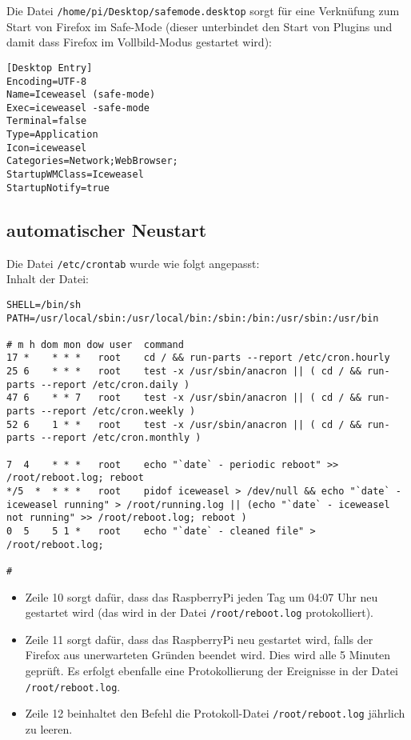 Die Datei \lstinline|/home/pi/Desktop/safemode.desktop| sorgt für eine Verknüfung zum Start von Firefox im Safe-Mode (dieser unterbindet den Start von Plugins und damit dass Firefox im Vollbild-Modus gestartet wird):\\
\begin{lstlisting}
[Desktop Entry]
Encoding=UTF-8
Name=Iceweasel (safe-mode)
Exec=iceweasel -safe-mode
Terminal=false
Type=Application
Icon=iceweasel
Categories=Network;WebBrowser;
StartupWMClass=Iceweasel
StartupNotify=true
\end{lstlisting}

\subsection{automatischer Neustart}
\label{sec:rebootconf}
Die Datei \lstinline|/etc/crontab| wurde wie folgt angepasst:\\
Inhalt der Datei:
\begin{lstlisting}
SHELL=/bin/sh
PATH=/usr/local/sbin:/usr/local/bin:/sbin:/bin:/usr/sbin:/usr/bin

# m h dom mon dow user	command
17 *	* * *	root    cd / && run-parts --report /etc/cron.hourly
25 6	* * *	root	test -x /usr/sbin/anacron || ( cd / && run-parts --report /etc/cron.daily )
47 6	* * 7	root	test -x /usr/sbin/anacron || ( cd / && run-parts --report /etc/cron.weekly )
52 6	1 * *	root	test -x /usr/sbin/anacron || ( cd / && run-parts --report /etc/cron.monthly )

7  4	* * *	root	echo "`date` - periodic reboot" >> /root/reboot.log; reboot 
*/5  *	* * *	root	pidof iceweasel > /dev/null && echo "`date` - iceweasel running" > /root/running.log || (echo "`date` - iceweasel not running" >> /root/reboot.log; reboot )
0  5	5 1 *	root	echo "`date` - cleaned file" > /root/reboot.log;

#
\end{lstlisting}
\begin{itemize}
	\item {Zeile 10 sorgt dafür, dass das RaspberryPi jeden Tag um 04:07 Uhr neu gestartet wird (das wird in der Datei \lstinline|/root/reboot.log| protokolliert).}
	\item {Zeile 11 sorgt dafür, dass das RaspberryPi neu gestartet wird, falls der Firefox aus unerwarteten Gründen beendet wird. Dies wird alle 5 Minuten geprüft.
		Es erfolgt ebenfalle eine Protokollierung der Ereignisse in der Datei \lstinline|/root/reboot.log|.}
	\item {Zeile 12 beinhaltet den Befehl die Protokoll-Datei \lstinline|/root/reboot.log| jährlich zu leeren.}
\end{itemize}


